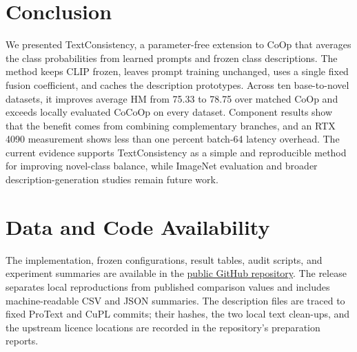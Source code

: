 \documentclass[preprint,12pt]{elsarticle}
\begin{document}
\section{Conclusion}

We presented TextConsistency, a parameter-free extension to CoOp that averages the class probabilities from learned prompts and frozen class descriptions. The method keeps CLIP frozen, leaves prompt training unchanged, uses a single fixed fusion coefficient, and caches the description prototypes. Across ten base-to-novel datasets, it improves average HM from 75.33 to 78.75 over matched CoOp and exceeds locally evaluated CoCoOp on every dataset. Component results show that the benefit comes from combining complementary branches, and an RTX 4090 measurement shows less than one percent batch-64 latency overhead. The current evidence supports TextConsistency as a simple and reproducible method for improving novel-class balance, while ImageNet evaluation and broader description-generation studies remain future work.

\section*{Data and Code Availability}

The implementation, frozen configurations, result tables, audit scripts, and experiment summaries are available in the \href{https://github.com/guiyangyuan/textconsistency_v2_tune}{public GitHub repository}. The release separates local reproductions from published comparison values and includes machine-readable CSV and JSON summaries. The description files are traced to fixed ProText and CuPL commits; their hashes, the two local text clean-ups, and the upstream licence locations are recorded in the repository's preparation reports.



\end{document}

